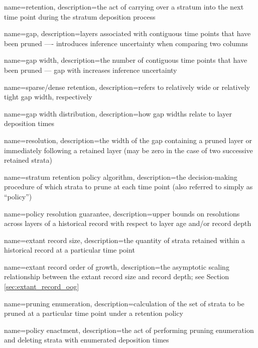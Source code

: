 {
    name=retention,
    description={the act of carrying over a stratum into the next time point during the stratum deposition process}
}

{
    name=gap,
    description={layers associated with contiguous time points that have been pruned ---- introduces inference uncertainty when comparing two columns}
}

{
    name=gap width,
    description={the number of contiguous time points that have been pruned --- gap with increases inference uncertainty}
}

{
    name=sparse/dense retention,
    description={refers to relatively wide or relatively tight gap width, respectively}
}

{
    name=gap width distribution,
    description={how gap widths relate to layer deposition times}
}

{
    name=resolution,
    description={the width of the gap containing a pruned layer or immediately following a retained layer (may be zero in the case of two successive retained strata)}
}

{
    name=stratum retention policy algorithm,
    description={the decision-making procedure of which strata to prune at each time point (also referred to simply as ``policy'')}
}

{
    name=policy resolution guarantee,
    description={upper bounds on resolutions across layers of a historical record with respect to layer age and/or record depth}
}

{
    name=extant record size,
    description={the quantity of strata retained within a historical record at a particular time point}
}

{
    name=extant record order of growth,
    description={the asymptotic scaling relationship between the extant record size and record depth; see Section \ref{sec:extant_record_oog}}
}

{
    name=pruning enumeration,
    description={calculation of the set of strata to be pruned at a particular time point under a retention policy}
}

{
    name=policy enactment,
    description={the act of performing pruning enumeration and deleting strata with enumerated deposition times}
}

